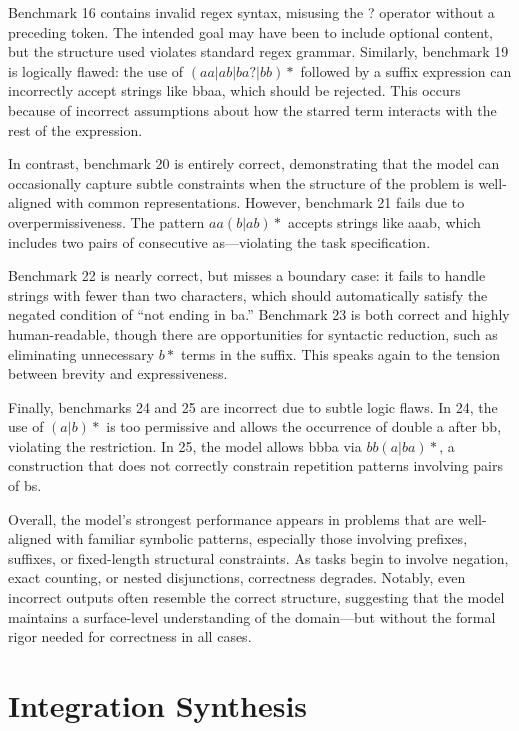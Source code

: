 \indent\indent Benchmark 16 contains invalid regex syntax, misusing the ? operator without a preceding token. The intended goal may have been to include optional content, but the structure used violates standard regex grammar. Similarly, benchmark 19 is logically flawed: the use of $(aa|ab|ba?|bb)*$ followed by a suffix expression can incorrectly accept strings like bbaa, which should be rejected. This occurs because of incorrect assumptions about how the starred term interacts with the rest of the expression.

\indent\indent In contrast, benchmark 20 is entirely correct, demonstrating that the model can occasionally capture subtle constraints when the structure of the problem is well-aligned with common representations. However, benchmark 21 fails due to overpermissiveness. The pattern $aa(b|ab)*$ accepts strings like aaab, which includes two pairs of consecutive as—violating the task specification.

\indent\indent Benchmark 22 is nearly correct, but misses a boundary case: it fails to handle strings with fewer than two characters, which should automatically satisfy the negated condition of “not ending in ba.” Benchmark 23 is both correct and highly human-readable, though there are opportunities for syntactic reduction, such as eliminating unnecessary $b*$ terms in the suffix. This speaks again to the tension between brevity and expressiveness.

\indent\indent Finally, benchmarks 24 and 25 are incorrect due to subtle logic flaws. In 24, the use of $(a|b)*$ is too permissive and allows the occurrence of double a after bb, violating the restriction. In 25, the model allows bbba via $bb(a|ba)*$, a construction that does not correctly constrain repetition patterns involving pairs of bs.

\indent\indent Overall, the model's strongest performance appears in problems that are well-aligned with familiar symbolic patterns, especially those involving prefixes, suffixes, or fixed-length structural constraints. As tasks begin to involve negation, exact counting, or nested disjunctions, correctness degrades. Notably, even incorrect outputs often resemble the correct structure, suggesting that the model maintains a surface-level understanding of the domain—but without the formal rigor needed for correctness in all cases.

\section{Integration Synthesis}

